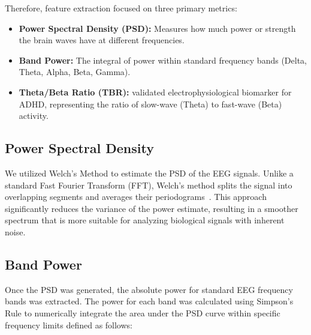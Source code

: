 \documentclass[11pt,a4paper]{article}
\begin{document}
Therefore, feature extraction focused on three primary metrics:

\begin{itemize}
    \item \textbf{Power Spectral Density (PSD):} Measures how much power or strength the brain waves have at different frequencies.
    \item \textbf{Band Power:} The integral of power within standard frequency bands (Delta, Theta, Alpha, Beta, Gamma).
    \item \textbf{Theta/Beta Ratio (TBR):}  validated electrophysiological biomarker for ADHD, representing the ratio of slow-wave (Theta) to 
        fast-wave (Beta) activity.
\end{itemize}


\subsection{Power Spectral Density}
We utilized Welch's Method to estimate the PSD of the EEG signals. Unlike a standard Fast Fourier Transform (FFT), Welch's method splits the 
signal into overlapping segments and averages their periodograms~\cite{welch2003use}. This approach significantly reduces the variance of the 
power estimate, resulting in a smoother spectrum that is more suitable for analyzing biological signals with inherent noise.


\subsection{Band Power}
Once the PSD was generated, the absolute power for standard EEG frequency bands was extracted. The power for each band was calculated using 
Simpson's Rule to numerically integrate the area under the PSD curve within specific frequency limits defined as follows:

\begin{table}[H]
    \centering
    \caption{EEG Frequency Bands and associated cognitive states}
    \label{tab:bands}
\end{table}
\end{document}

